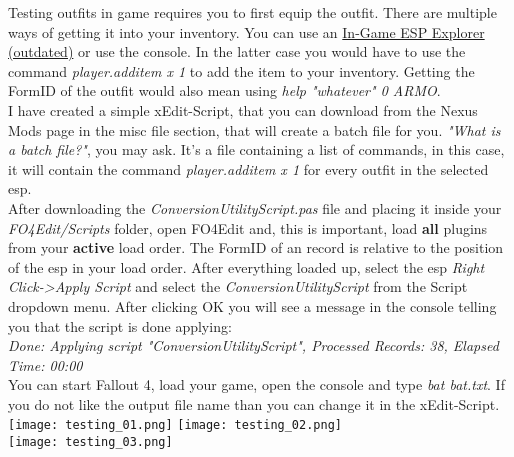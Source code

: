Testing outfits in game requires you to first equip the outfit. There are multiple ways of getting it into your inventory.
You can use an \href{https://www.nexusmods.com/fallout4/mods/16718}{In-Game ESP Explorer (outdated)} or use the console.
In the latter case you would have to use the command \textit{player.additem x 1} to add the item to your inventory. Getting the 
FormID of the outfit would also mean using \textit{help "whatever" 0 ARMO}.\\
I have created a simple xEdit-Script, that you can download from the Nexus Mods page in the misc file section, that will create a 
batch file for you. \textit{"What is a batch file?"}, you may ask. It's a file containing a list of commands, in this case, it will 
contain the command \textit{player.additem x 1} for every outfit in the selected esp.\\
After downloading the \textit{ConversionUtilityScript.pas} file and placing it inside your \textit{FO4Edit/Scripts} folder, open 
FO4Edit and, this is important, load \textbf{all} plugins from your \textbf{active} load order. The FormID of an record is relative to 
the position of the esp in your load order. After everything loaded up, select the esp \textit{Right Click->Apply Script} and select the 
\textit{ConversionUtilityScript} from the Script dropdown menu. After clicking OK you will see a message in the console telling you 
that the script is done applying:\\
\textit{Done: Applying script "ConversionUtilityScript", Processed Records: 38, Elapsed Time: 00:00}\\
You can start Fallout 4, load your game, open the console and type \textit{bat bat.txt}. If you do not like 
the output file name than you can change it in the xEdit-Script.\\
\texttt{[image: testing\_01.png]}
\texttt{[image: testing\_02.png]}\\
\texttt{[image: testing\_03.png]}